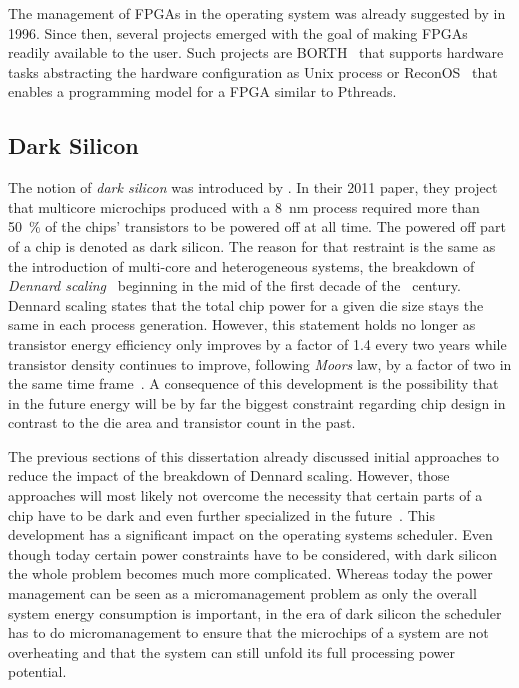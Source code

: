 The management of \acp{FPGA} in the operating system was already suggested by \textcite{Brebner-1996-FPGAOS} in 1996. Since then, several projects emerged with the goal of making \acp{FPGA} readily available to the user. Such projects are BORTH~\cite{So-2007-BORTH} that supports hardware tasks abstracting the hardware configuration as Unix process or ReconOS~\cite{Lubbers-2009-ReconOS} that enables a programming model for a \ac{FPGA} similar to \acp{Pthread}.

\subsection{Dark Silicon}

The notion of \emph{dark silicon} was introduced by \textcite{Esmaeilzadeh-2011-DarkSilicon}. In their 2011 paper, they project that multicore microchips produced with a \SI{8}{\nano\meter} process required more than \SI{50}{\percent} of the chips' transistors to be powered off at all time. The powered off part of a chip is denoted as dark silicon. The reason for that restraint is the same as the introduction of multi-core and heterogeneous systems, the breakdown of \emph{Dennard scaling}~\cite{Dennard-1974-Design} beginning in the mid of the first decade of the ~century. Dennard scaling states that the total chip power for a given die size stays the same in each process generation. However, this statement holds no longer as transistor energy efficiency only improves by a factor of \num{1.4} every two years while transistor density continues to improve, following \emph{Moors} law, by a factor of two in the same time frame~\cite{Taylor-2013-DarkSiliconLandscape}. A consequence of this development is the possibility that in the future energy will be by far the biggest constraint regarding chip design in contrast to the die area and transistor count in the past.

The previous sections of this dissertation already discussed initial approaches to reduce the impact of the breakdown of Dennard scaling. However, those approaches will most likely not overcome the necessity that certain parts of a chip have to be dark and even further specialized in the future~\cite[\cf][]{Taylor-2012-DarkSilicon}. This development has a significant impact on the operating systems scheduler. Even though today certain power constraints have to be considered, with dark silicon the whole problem becomes much more complicated. Whereas today the power management can be seen as a micromanagement problem as only the overall system energy consumption is important, in the era of dark silicon the scheduler has to do micromanagement to ensure that the microchips of a system are not overheating and that the system can still unfold its full processing power potential.

